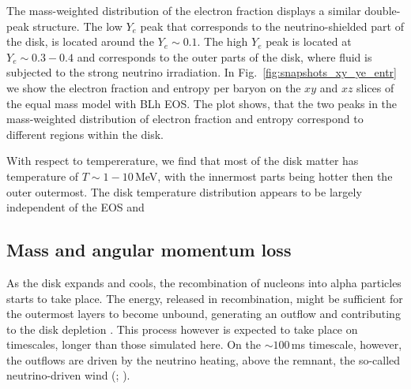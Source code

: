 The mass-weighted distribution 
of the electron fraction displays a similar double-peak structure.
The low $Y_e$ peak that corresponds to the neutrino-shielded part of the 
disk, is located around the $Y_e\sim0.1$. The high $Y_e$ peak is located at 
$Y_e\sim0.3-0.4$ and corresponds to the outer parts of the disk,
where fluid is subjected to the strong neutrino irradiation.
%
In Fig.~\ref{fig:snapshots_xy_ye_entr} we show the electron fraction 
and entropy per baryon on the $xy$ and $xz$ slices of the equal 
mass model with BLh \ac{EOS}. The plot shows, that the two peaks in the 
mass-weighted distribution of electron fraction and entropy correspond to 
different regions within the disk.

With respect to tempererature, we find that 
most of the disk matter has temperature of $T\sim 1-10\,$MeV, with the 
innermost parts being hotter then the outer outermost. 
The disk temperature distribution appears to be largely 
independent of the \ac{EOS} and \mr{}



\subsection{Mass and angular momentum loss}\label{sec:bns_sims:mj_loss}

As the disk expands and cools, the recombination of nucleons into alpha particles 
starts to take place. The energy, released in recombination, might be sufficient 
for the outermost layers to become unbound, generating an outflow and contributing 
to the disk depletion \citep{Beloborodov:2008nx,Lee:2009uc,Fernandez:2013tya}.
%
This process however is expected to take place on timescales, longer than
those simulated here. On the ${\sim}100\,$ms timescale, however, the outflows 
are driven by the neutrino heating, above the remnant, the so-called neutrino-driven 
wind (\nwind{}; \citet{Dessart:2008zd,Perego:2014fma,Just:2014fka}). 
%

